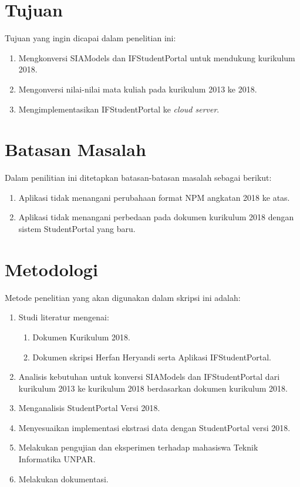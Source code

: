 \section{Tujuan}
\label{sec:tujuan}
Tujuan yang ingin dicapai dalam penelitian ini:
\begin{enumerate}
	\item Mengkonversi SIAModels dan IFStudentPortal untuk mendukung kurikulum 2018.
	\item Mengonversi nilai-nilai mata kuliah pada kurikulum 2013 ke 2018.
	\item Mengimplementasikan IFStudentPortal ke \textit{cloud server}.
\end{enumerate}

\section{Batasan Masalah}
\label{sec:batasan}
Dalam penilitian ini ditetapkan batasan-batasan masalah sebagai berikut:
\begin{enumerate}
	\item Aplikasi tidak menangani perubahaan format NPM angkatan 2018 ke atas.
	\item Aplikasi tidak menangani perbedaan pada dokumen kurikulum 2018 dengan sistem StudentPortal yang baru.
\end{enumerate}

\section{Metodologi}
\label{sec:metlit}
Metode penelitian yang akan digunakan dalam skripsi ini adalah:
\begin{enumerate}
	\item Studi literatur mengenai:
	\begin{enumerate}
		\item Dokumen Kurikulum 2018.
		\item Dokumen skripsi Herfan Heryandi\cite{skripsiherfan} serta Aplikasi IFStudentPortal.
	\end{enumerate}
	\item Analisis kebutuhan untuk konversi SIAModels dan IFStudentPortal dari kurikulum 2013 ke kurikulum 2018 berdasarkan dokumen kurikulum 2018.
	\item Menganalisis StudentPortal Versi 2018.
	\item Menyesuaikan implementasi ekstrasi data dengan StudentPortal versi 2018.
	\item Melakukan pengujian dan eksperimen terhadap mahasiswa Teknik Informatika UNPAR.
	\item Melakukan dokumentasi.
	
\end{enumerate}

